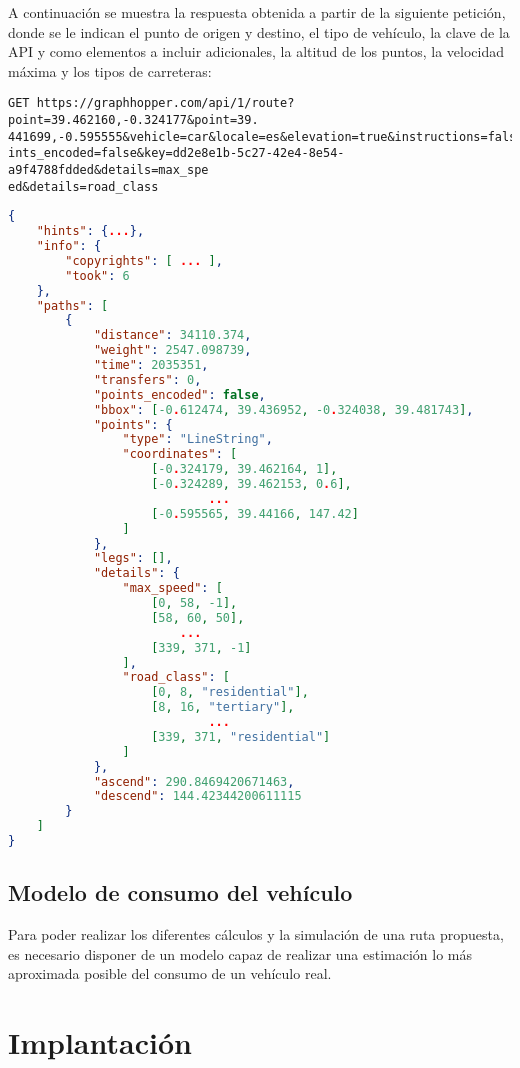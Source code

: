 \documentclass[11pt,spanish,listoffigures,listoftables]{tfgetsinf}
\begin{document}
A continuación se muestra la respuesta obtenida a partir de la siguiente petición, donde se le indican el punto de origen y destino, el tipo de vehículo, la clave de la API y como elementos a incluir adicionales, la altitud de los puntos, la velocidad máxima y los tipos de carreteras:
\begin{verbatim}
GET https://graphhopper.com/api/1/route?point=39.462160,-0.324177&point=39.
441699,-0.595555&vehicle=car&locale=es&elevation=true&instructions=false&po
ints_encoded=false&key=dd2e8e1b-5c27-42e4-8e54-a9f4788fdded&details=max_spe
ed&details=road_class
\end{verbatim}
\begin{lstlisting}[language=json]
{
    "hints": {...},
    "info": {
        "copyrights": [ ... ],
        "took": 6
    },
    "paths": [
        {
            "distance": 34110.374,
            "weight": 2547.098739,
            "time": 2035351,
            "transfers": 0,
            "points_encoded": false,
            "bbox": [-0.612474, 39.436952, -0.324038, 39.481743],
            "points": {
                "type": "LineString",
                "coordinates": [
                    [-0.324179, 39.462164, 1],
                    [-0.324289, 39.462153, 0.6],
                            ...
                    [-0.595565, 39.44166, 147.42]
                ]
            },
            "legs": [],
            "details": {
                "max_speed": [
                    [0, 58, -1],
                    [58, 60, 50],
                        ...
                    [339, 371, -1]
                ],
                "road_class": [
                    [0, 8, "residential"],
                    [8, 16, "tertiary"],
                            ...
                    [339, 371, "residential"]
                ]
            },
            "ascend": 290.8469420671463,
            "descend": 144.42344200611115
        }
    ]
}
\end{lstlisting}

\section{Modelo de consumo del vehículo}
Para poder realizar los diferentes cálculos y la simulación de una ruta propuesta, es necesario disponer de un modelo capaz de realizar una estimación lo más aproximada posible del consumo de un vehículo real.
\chapter{Implantación}
\end{document}
